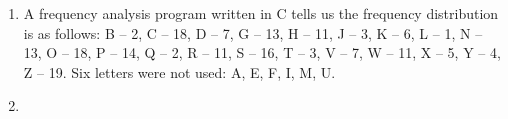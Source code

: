 \documentclass[12pt,letterpaper]{article}
\begin{document}
\pagestyle{fancy}
\rhead{\today}

\begin{enumerate}

    \item
        A frequency analysis program written in C tells us the frequency distribution is as follows:
            B -- 2,
            C -- 18,
            D -- 7, 
            G -- 13,
            H -- 11,
            J -- 3,
            K -- 6,
            L -- 1,
            N -- 13,
            O -- 18,
            P -- 14,
            Q -- 2,
            R -- 11,
            S -- 16,
            T -- 3,
            V -- 7,
            W -- 11,
            X -- 5,
            Y -- 4,
            Z -- 19.
        Six letters were not used: A, E, F, I, M, U.

    \item

\end{enumerate}
\end{document}
